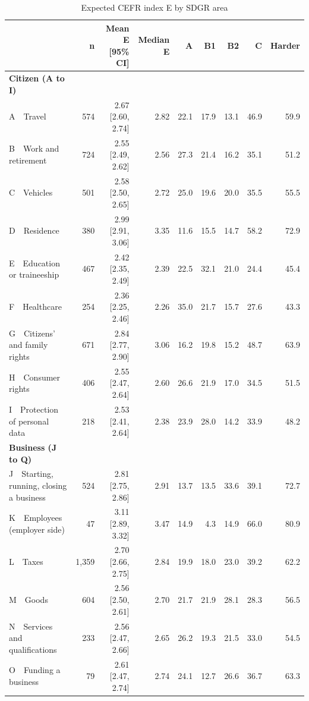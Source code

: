 \begin{table}[htbp]
\centering
\footnotesize\setlength{\tabcolsep}{4pt}
\begin{threeparttable}
\caption{Expected CEFR index E by SDGR area}
\label{tab:e-by-area}
\begin{tabular}{lrrrrrrrr}
\hline
 & n & Mean E [95\% CI] & Median E & A & B1 & B2 & C & Harder \\
\hline
\textbf{Citizen (A to I)} &  &  &  &  &  &  &  &  \\
\quad A~~Travel & 574 & 2.67 [2.60, 2.74] & 2.82 & 22.1 & 17.9 & 13.1 & 46.9 & 59.9 \\
\quad B~~Work and retirement & 724 & 2.55 [2.49, 2.62] & 2.56 & 27.3 & 21.4 & 16.2 & 35.1 & 51.2 \\
\quad C~~Vehicles & 501 & 2.58 [2.50, 2.65] & 2.72 & 25.0 & 19.6 & 20.0 & 35.5 & 55.5 \\
\quad D~~Residence & 380 & 2.99 [2.91, 3.06] & 3.35 & 11.6 & 15.5 & 14.7 & 58.2 & 72.9 \\
\quad E~~Education or traineeship & 467 & 2.42 [2.35, 2.49] & 2.39 & 22.5 & 32.1 & 21.0 & 24.4 & 45.4 \\
\quad F~~Healthcare & 254 & 2.36 [2.25, 2.46] & 2.26 & 35.0 & 21.7 & 15.7 & 27.6 & 43.3 \\
\quad G~~Citizens' and family rights & 671 & 2.84 [2.77, 2.90] & 3.06 & 16.2 & 19.8 & 15.2 & 48.7 & 63.9 \\
\quad H~~Consumer rights & 406 & 2.55 [2.47, 2.64] & 2.60 & 26.6 & 21.9 & 17.0 & 34.5 & 51.5 \\
\quad I~~Protection of personal data & 218 & 2.53 [2.41, 2.64] & 2.38 & 23.9 & 28.0 & 14.2 & 33.9 & 48.2 \\
\hline
\textbf{Business (J to Q)} &  &  &  &  &  &  &  &  \\
\quad J~~Starting, running, closing a business & 524 & 2.81 [2.75, 2.86] & 2.91 & 13.7 & 13.5 & 33.6 & 39.1 & 72.7 \\
\quad K~~Employees (employer side) & 47 & 3.11 [2.89, 3.32] & 3.47 & 14.9 & 4.3 & 14.9 & 66.0 & 80.9 \\
\quad L~~Taxes & 1,359 & 2.70 [2.66, 2.75] & 2.84 & 19.9 & 18.0 & 23.0 & 39.2 & 62.2 \\
\quad M~~Goods & 604 & 2.56 [2.50, 2.61] & 2.70 & 21.7 & 21.9 & 28.1 & 28.3 & 56.5 \\
\quad N~~Services and qualifications & 233 & 2.56 [2.47, 2.66] & 2.65 & 26.2 & 19.3 & 21.5 & 33.0 & 54.5 \\
\quad O~~Funding a business & 79 & 2.61 [2.47, 2.74] & 2.74 & 24.1 & 12.7 & 26.6 & 36.7 & 63.3 \\

\end{tabular}
\end{threeparttable}
\end{table}

